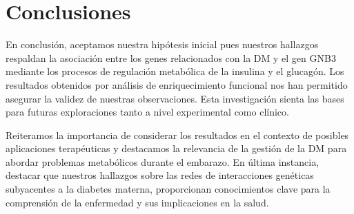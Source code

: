 \section{Conclusiones}

En conclusión, aceptamos nuestra hipótesis inicial pues nuestros hallazgos respaldan la asociación entre los genes relacionados con la DM y el gen GNB3 mediante los procesos de regulación metabólica de la insulina y el glucagón. Los resultados obtenidos por análisis de enriquecimiento funcional nos han permitido asegurar la validez de nuestras observaciones.
Esta investigación sienta las bases para futuras exploraciones tanto a nivel experimental como clínico.

Reiteramos la importancia de considerar los resultados en el contexto de posibles aplicaciones terapéuticas y destacamos la relevancia de la gestión de la DM para abordar problemas metabólicos durante el embarazo. 
En última instancia, destacar que nuestros hallazgos sobre las redes de interacciones genéticas subyacentes a la diabetes materna, proporcionan conocimientos clave para la comprensión de la enfermedad y sus implicaciones en la salud.

